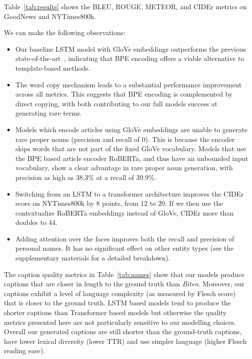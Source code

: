 
Table~\ref{tab:results} shows the BLEU, ROUGE, METEOR, and CIDEr metrics on
GoodNews and NYTimes800k.

We can make the following observations:

\begin{itemize}
   \item Our baseline LSTM model with GloVe embeddings outperforms the previous
   state-of-the-art~\cite{Biten2019GoodNews}, indicating that BPE encoding
   offers a viable alternative to template-based methods.

   \item The word copy mechanism leads to a substantial performance improvement
   across all metrics. This suggests that BPE encoding is complemented by
   direct copying, with both contributing to our full models success at
   generating rare terms.

   \item Models which encode articles using GloVe embeddings are unable to
   generate rare proper nouns (precision and recall of 0).
   This is because the encoder skips words that are not part of the fixed GloVe
   vocabulary. Models that use the BPE based article encoder RoBERTa, and thus
   have an unbounded input vocabulary, show
   a clear advantage in rare proper noun generation, with precision as high as
   38.3\% at a recall of 39.9\%.

   \item Switching from an LSTM to a transformer architecture improves the
   CIDEr score on NYTimes800k by 8 points, from 12 to 20. If we then use the
   contextualize RoBERTa embeddings instead of GloVe, CIDEr more than doubles
   to 44.

   \item Adding attention over the faces improves both the recall and precision
   of personal names. It has no significant effect on other entity types (see
   the supplementary materials for a detailed breakdown).


\end{itemize}

The caption quality metrics in Table~\ref{tab:names} show that our
models produce captions that are closer in length to the ground truth than
\textit{Biten}. Moreover, our captions exhibit a level of language complexity
(as measured
by Flesch score) that is closer to the ground truth. LSTM based
models tend to produce the shorter captions than Transformer based models but
otherwise the quality metrics presented here are not particularly sensitive to
our modelling choices. Overall our generated captions
are still
shorter than the ground-truth captions, have lower lexical diversity (lower TTR)
and use simpler language (higher Flesch reading ease).
